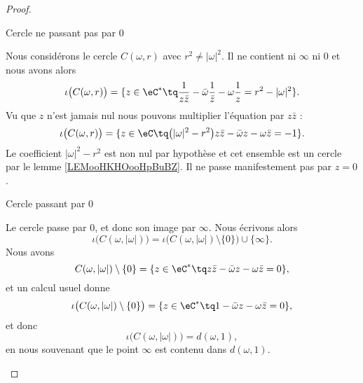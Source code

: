 \begin{proof}
\begin{subproof}
        \item[Cercle ne passant pas par \( 0\)]


            Nous considérons le cercle \( C(\omega,r)\) avec \( r^2\neq | \omega |^2\). Il ne contient ni \( \infty\) ni \( 0\) et nous avons alors
            \begin{equation}
                \iota\big( C(\omega,r) \big)=\{ z\in \eC^*\tq \frac{1}{ z\bar z }-\bar\omega\frac{1}{ \bar z }-\omega\frac{1}{ z }=r^2-| \omega |^2 \}.
            \end{equation}
            Vu que \( z\) n'est jamais nul nous pouvons multiplier l'équation par \( z\bar z\) :
            \begin{equation}
                \iota\big( C(\omega,r) \big)=\{ z\in \eC\tq \big( | \omega |^2-r^2 \big)z\bar z-\bar\omega z-\omega\bar z=-1 \}.
            \end{equation}
            Le coefficient \( | \omega |^2-r^2\) est non nul par hypothèse et cet ensemble est un cercle par le lemme \ref{LEMooHKHOooHpBuBZ}. Il ne passe manifestement pas par \( z=0\).


        \item[Cercle passant par \( 0\)]

            Le cercle passe par \( 0\), et donc son image par \( \infty\). Nous écrivons alors
            \begin{equation}
                \iota\big( C(\omega,| \omega |) \big)=\iota\big( C(\omega,| \omega |)\setminus\{ 0 \} \big)\cup\{ \infty \}.
            \end{equation}
            Nous avons 
            \begin{equation}
                C(\omega,| \omega |)\setminus \{ 0 \} =\{ z\in \eC^*\tq z\bar z-\bar \omega z-\omega\bar z=0 \},
            \end{equation}
            et un calcul usuel donne
            \begin{equation}
                \iota\big( C(\omega,| \omega |)\setminus \{ 0 \}  \big)=\{ z\in \eC^*\tq 1-\bar \omega z-\omega\bar z=0 \},
            \end{equation}
            et donc
            \begin{equation}
                \iota\big( C(\omega,| \omega |) \big)=d(\omega,1),
            \end{equation}
            en nous souvenant que le point \( \infty\) est contenu dans \( d(\omega,1)\).

    \end{subproof}
\end{proof}

